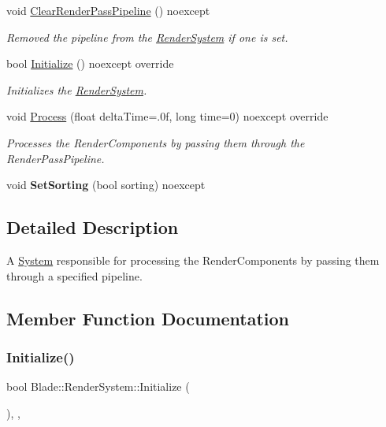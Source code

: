 \begin{DoxyCompactItemize}
void \hyperlink{class_blade_1_1_render_system_a8f09fc8598972eacddd158fc14fc3cde}{Clear\+Render\+Pass\+Pipeline} () noexcept
\begin{DoxyCompactList}\small\item\em Removed the pipeline from the \hyperlink{class_blade_1_1_render_system}{Render\+System} if one is set. \end{DoxyCompactList}\item 
bool \hyperlink{class_blade_1_1_render_system_a476d3d55dcc9f65e8a88096aace6dcfc}{Initialize} () noexcept override
\begin{DoxyCompactList}\small\item\em Initializes the \hyperlink{class_blade_1_1_render_system}{Render\+System}. \end{DoxyCompactList}\item 
void \hyperlink{class_blade_1_1_render_system_a8edd0d0c9d5d54c395a03f98f6b16fb9}{Process} (float delta\+Time=.\+0f, long time=0) noexcept override
\begin{DoxyCompactList}\small\item\em Processes the Render\+Components by passing them through the Render\+Pass\+Pipeline. \end{DoxyCompactList}\item 
\mbox{\label{class_blade_1_1_render_system_a6bbc18b56812347c4960336f5d15effa}} 
void {\bfseries Set\+Sorting} (bool sorting) noexcept
\end{DoxyCompactItemize}


\subsection{Detailed Description}
A \hyperlink{class_blade_1_1_system}{System} responsible for processing the Render\+Components by passing them through a specified pipeline. 

\subsection{Member Function Documentation}
\mbox{\label{class_blade_1_1_render_system_a476d3d55dcc9f65e8a88096aace6dcfc}} 
\subsubsection{\texorpdfstring{Initialize()}{Initialize()}}
{\footnotesize\ttfamily bool Blade\+::\+Render\+System\+::\+Initialize (\begin{DoxyParamCaption}{ }\end{DoxyParamCaption})\hspace{0.3cm}{\ttfamily [override]}, {\ttfamily [virtual]}, {\ttfamily [noexcept]}}




